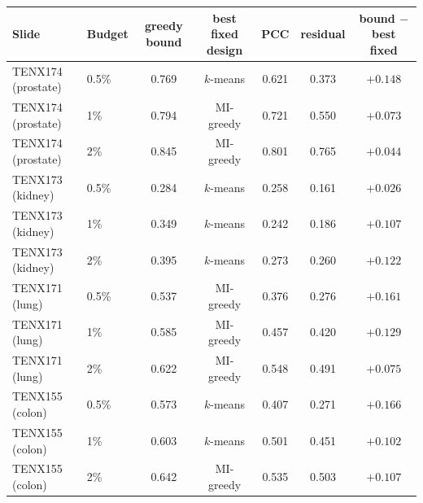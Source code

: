 \begin{tabular}{llccccc}
\toprule
Slide & Budget & greedy bound & best fixed design & PCC & residual & bound $-$ best fixed \\
\midrule
TENX174 (prostate) & 0.5\% & 0.769 & $k$-means & 0.621 & 0.373 & ${+}0.148$ \\
TENX174 (prostate) & 1\% & 0.794 & MI-greedy & 0.721 & 0.550 & ${+}0.073$ \\
TENX174 (prostate) & 2\% & 0.845 & MI-greedy & 0.801 & 0.765 & ${+}0.044$ \\
TENX173 (kidney) & 0.5\% & 0.284 & $k$-means & 0.258 & 0.161 & ${+}0.026$ \\
TENX173 (kidney) & 1\% & 0.349 & $k$-means & 0.242 & 0.186 & ${+}0.107$ \\
TENX173 (kidney) & 2\% & 0.395 & $k$-means & 0.273 & 0.260 & ${+}0.122$ \\
TENX171 (lung) & 0.5\% & 0.537 & MI-greedy & 0.376 & 0.276 & ${+}0.161$ \\
TENX171 (lung) & 1\% & 0.585 & MI-greedy & 0.457 & 0.420 & ${+}0.129$ \\
TENX171 (lung) & 2\% & 0.622 & MI-greedy & 0.548 & 0.491 & ${+}0.075$ \\
TENX155 (colon) & 0.5\% & 0.573 & $k$-means & 0.407 & 0.271 & ${+}0.166$ \\
TENX155 (colon) & 1\% & 0.603 & $k$-means & 0.501 & 0.451 & ${+}0.102$ \\
TENX155 (colon) & 2\% & 0.642 & MI-greedy & 0.535 & 0.503 & ${+}0.107$ \\
\bottomrule
\end{tabular}